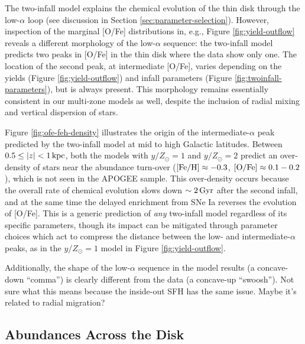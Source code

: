 \documentclass[twocolumn,twocolappendix,linenumbers]{aastex631}
\newcommand{\todo}[1]{{\color{red}#1}}
\newcommand{\mathFeH}{{\rm [Fe/H]}}
\newcommand{\mathOFe}{{\rm [O/Fe]}}
\begin{document}
The two-infall model explains the chemical evolution of the thin disk through the low-$\alpha$ loop (see discussion in Section \ref{sec:parameter-selection}). However, inspection of the marginal [O/Fe] distributions in, e.g., Figure \ref{fig:yield-outflow} reveals a different morphology of the low-$\alpha$ sequence: the two-infall model predicts two peaks in [O/Fe] in the thin disk where the data show only one. The location of the second peak, at intermediate [O/Fe], varies depending on the yields (Figure \ref{fig:yield-outflow}) and infall parameters (Figure \ref{fig:twoinfall-parameters}), but is always present. This morphology remains essentially consistent in our multi-zone models as well, despite the inclusion of radial mixing and vertical dispersion of stars.

Figure \ref{fig:ofe-feh-density} illustrates the origin of the intermediate-$\alpha$ peak predicted by the two-infall model at mid to high Galactic latitudes. Between $0.5\leq|z|<1\,{\rm kpc}$, both the models with $y/Z_\odot=1$ and $y/Z_\odot=2$ predict an over-density of stars near the abundance turn-over ($\mathFeH\approx-0.3$, $\mathOFe\approx0.1-0.2$), which is not seen in the APOGEE sample. This over-density occurs because the overall rate of chemical evolution slows down $\sim2\,{\rm Gyr}$ after the second infall, and at the same time the delayed enrichment from SNe Ia reverses the evolution of [O/Fe]. This is a generic prediction of {\it any} two-infall model regardless of its specific parameters, though its impact can be mitigated through parameter choices which act to compress the distance between the low- and intermediate-$\alpha$ peaks, as in the $y/Z_\odot=1$ model in Figure \ref{fig:yield-outflow}.

Additionally, the shape of the low-$\alpha$ sequence in the model results (a concave-down ``comma'') is clearly different from the data (a concave-up ``swoosh''). \todo{Not sure what this means because the inside-out SFH has the same issue. Maybe it's related to radial migration?}

\subsection{Abundances Across the Disk}
\label{sec:disk-abundances}
\end{document}
